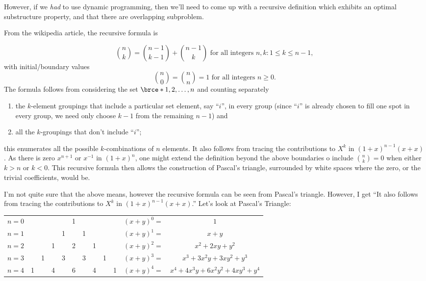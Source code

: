 However, if we \emph{had} to use dynamic programming, then we'll need to
come up with a recursive definition which exhibits an optimal substructure
property, and that there are overlapping subproblem.

From the wikipedia article, the recursive formula is
\begin{mdframed}[style=mdfNOTE,
frametitle={Recursive formula from wikipedia}]
\begin{equation*}
\binom{n}{k} = \binom{n-1}{k-1}+\binom{n-1}{k}
\text{ for all integers }n,k:1\leq k \leq n-1,
\end{equation*}
with initial/boundary values
\begin{equation*}
\binom{n}{0} = \binom{n}{n} = 1 \text{ for all integers }n\geq 0.
\end{equation*}
The formula follows from considering the set $\brce*{1,2,\ldots,n}$ and
counting separately
\begin{enumerate}[label=\textbf{\alph*.}]
\item the $k$-element groupings that include a particular set element, say
  ``$i$'', in every group (since ``$i$'' is already chosen to fill one spot
  in every group, we need only choose $k-1$ from the remaining $n-1$) and
\item all the $k$-groupings that don't include ``$i$''; 
\end{enumerate}
this enumerates all the possible $k$-combinations of $n$ elements. It also
follows from tracing the contributions to $X^k$ in $(1+x)^{n-1}(x+x)$. As
there is zero $x^{n+1}$ or $x^{-1}$ in $(1+x)^n$, one might extend the
definition beyond the above boundaries o include $\binom{n}{k}=0$ when
either $k>n$ or $k<0$. This recursive formula then allows the construction
of Pascal's triangle, surrounded by white spaces where the zero, or the
trivial coefficients, would be.
\end{mdframed}

I'm not quite sure that the above means, however the recursive formula can
be seen from Pascal's triangle. However, I get ``It also follows from
tracing the contributions to $X^k$ in $(1+x)^{n-1}(x+x)$.'' Let's look at
Pascal's Triangle:

\begin{tabular}{cccccccccccc}
$n=0$ &&&&&1&&&&    &$(x+y)^0=$&$1$\\
$n=1$ &&&&1&&1&&&   &$(x+y)^1=$&$x+y$\\
$n=2$ &&&1&&2&&1&&  &$(x+y)^2=$&$x^2+2xy+y^2$\\
$n=3$ &&1&&3&&3&&1& &$(x+y)^3=$&$x^3+3x^2y+3xy^2+y^3$\\
$n=4$ &1&&4&&6&&4&&1&$(x+y)^4=$&$x^4+4x^3y+6x^2y^2+4xy^3+y^4$
\end{tabular}

